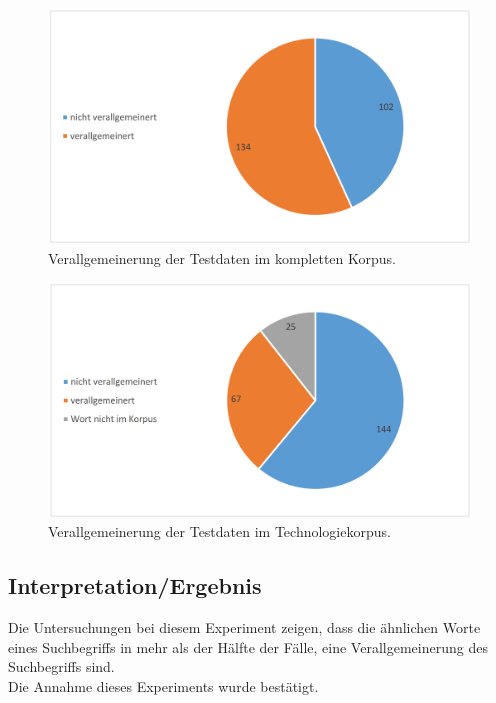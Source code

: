 \documentclass[12pt,a4paper]{report}
\begin{document}
\begin{figure}[p]
  \begin{center}
	\includegraphics[scale=0.4]{VerallgemeinerungFull.PNG}
  \end{center}  
  \caption{Verallgemeinerung der Testdaten im kompletten Korpus.}

\end{figure}
\begin{figure}[p]
  \begin{center}
	\includegraphics[scale=0.4]{VerallgemeinerungTech.PNG}
  \end{center}  
  \caption{Verallgemeinerung der Testdaten im Technologiekorpus.}
  \end{figure}	
  \newpage
		\subsection{Interpretation/Ergebnis}
		Die Untersuchungen bei diesem Experiment zeigen, dass die ähnlichen Worte eines Suchbegriffs in mehr als der Hälfte der Fälle, eine Verallgemeinerung des Suchbegriffs sind. \\
		Die Annahme dieses Experiments wurde bestätigt.\\
		
\end{document}
